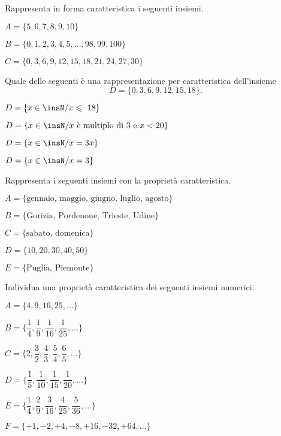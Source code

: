 \begin{esercizio}
\label{ese:6.15}
Rappresenta in forma caratteristica i seguenti insiemi.
\begin{enumeratea}
\item $A=\{5, 6, 7, 8, 9, 10\}$
\item $B=\{0, 1, 2, 3, 4, 5, \dots, 98, 99, 100\}$
\item$ C=\{0, 3, 6, 9, 12, 15, 18, 21, 24, 27, 30\}$
\end{enumeratea}
\end{esercizio}

\begin{esercizio}
\label{ese:6.16}
Quale delle seguenti è una rappresentazione per caratteristica
dell'insieme
\[D = \{0, 3, 6, 9, 12, 15, 18\}.\]
\begin{multicols}{2}
\begin{enumeratea}
\item $D=\{x\in\insN/x\leqslant~18\}$
\item $D=\{x\in\insN/x\text{ è multiplo di~3 e }x<20\}$%
\item $D=\{x\in\insN/x=3x\}$
\item $D=\{x\in\insN/x=3\}$
\end{enumeratea}
\end{multicols}
\end{esercizio}

\begin{esercizio}
\label{ese:6.17}
Rappresenta i seguenti insiemi con la proprietà caratteristica.
\begin{enumeratea}
 \item $A=\{\text{gennaio, maggio, giugno, luglio, agosto}\}$
 \item $B=\{\text{Gorizia, Pordenone, Trieste, Udine}\}$
 \item $C=\{\text{sabato, domenica}\}$
 \item $D=\{10, 20, 30, 40, 50\}$
 \item $E=\{\text{Puglia, Piemonte}\}$
 \end{enumeratea}
\end{esercizio}

\begin{esercizio}
Individua una proprietà caratteristica dei seguenti insiemi numerici.
\label{ese:6.18}
\begin{multicols}{2}
\begin{enumeratea}
\spazielenx
 \item $A=\{4,9,16,25,\ldots\}$
 \item 
$B=\bigg\{\dfrac{1}{4},\dfrac{1}{9},\dfrac{1}{16},\dfrac{1}{25},\ldots\bigg\}$
 \item 
$C=\bigg\{2,\dfrac{3}{2},\dfrac{4}{3},\dfrac{5}{4},\dfrac{6}{5},\ldots\bigg\}$
 \item 
$D=\bigg\{\dfrac{1}{5},\dfrac{1}{10},\dfrac{1}{15},\dfrac{1}{20},\ldots\bigg\}$
 \item 
$E=\bigg\{\dfrac{1}{4},\dfrac{2}{9},\dfrac{3}{16},\dfrac{4}{25},\dfrac{5}{36},
\ldots\bigg\}$
 \item $F=\{+1, -2, +4, -8, +16, -32, +64, \ldots\}$
 \end{enumeratea}
\end{multicols}
\end{esercizio}


